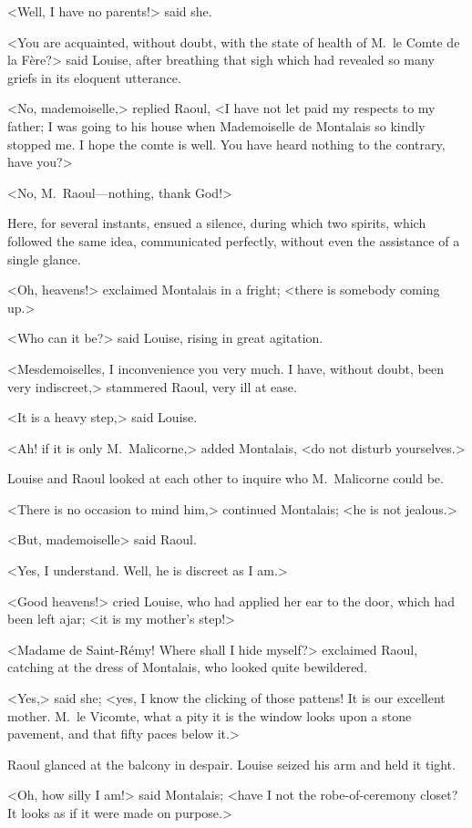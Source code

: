 <Well, I have no parents!> said she.

<You are acquainted, without doubt, with the state of health of M.~le Comte de la Fère?> said Louise, after breathing that sigh which had revealed so many griefs in its eloquent utterance.

<No, mademoiselle,> replied Raoul, <I have not let paid my respects to my father; I was going to his house when Mademoiselle de Montalais so kindly stopped me. I hope the comte is well. You have heard nothing to the contrary, have you?>

<No, M.~Raoul—nothing, thank God!>

Here, for several instants, ensued a silence, during which two spirits, which followed the same idea, communicated perfectly, without even the assistance of a single glance.

<Oh, heavens!> exclaimed Montalais in a fright; <there is somebody coming up.>

<Who can it be?> said Louise, rising in great agitation.

<Mesdemoiselles, I inconvenience you very much. I have, without doubt, been very indiscreet,> stammered Raoul, very ill at ease.

<It is a heavy step,> said Louise.

<Ah! if it is only M.~Malicorne,> added Montalais, <do not disturb yourselves.>

Louise and Raoul looked at each other to inquire who M.~Malicorne could be.

<There is no occasion to mind him,> continued Montalais; <he is not jealous.>

<But, mademoiselle\longdash> said Raoul.

<Yes, I understand. Well, he is discreet as I am.>

<Good heavens!> cried Louise, who had applied her ear to the door, which had been left ajar; <it is my mother's step!>

<Madame de Saint-Rémy! Where shall I hide myself?> exclaimed Raoul, catching at the dress of Montalais, who looked quite bewildered.

<Yes,> said she; <yes, I know the clicking of those pattens! It is our excellent mother. M.~le Vicomte, what a pity it is the window looks upon a stone pavement, and that fifty paces below it.>

Raoul glanced at the balcony in despair. Louise seized his arm and held it tight.

<Oh, how silly I am!> said Montalais; <have I not the robe-of-ceremony closet? It looks as if it were made on purpose.>

